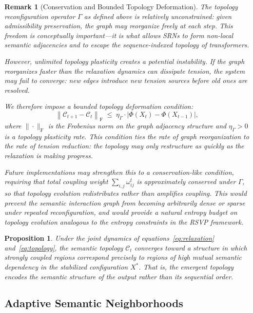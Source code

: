 \documentclass[11pt, a4paper]{article}
\theoremstyle{srn}
\newtheorem{proposition}{Proposition}[section]
\theoremstyle{srnremark}
\newtheorem{remark}{Remark}[section]
\newcommand{\Cstruct}{\mathcal{C}}           %
\newcommand{\Gop}{\Gamma}              %
\newcommand{\Phiten}{\varPhi}            %
\begin{document}
\begin{remark}[Conservation and Bounded Topology Deformation]
\label{rem:bounded}
The topology reconfiguration operator $\Gop$ as defined above is
relatively unconstrained: given admissibility preservation, the graph
may reorganize freely at each step.
This freedom is conceptually important---it is what allows SRNs to
form non-local semantic adjacencies and to escape the sequence-indexed
topology of transformers.

However, unlimited topology plasticity creates a potential instability.
If the graph reorganizes faster than the relaxation dynamics can
dissipate tension, the system may fail to converge: new edges
introduce new tension sources before old ones are resolved.

We therefore impose a \emph{bounded topology deformation} condition:
\[
  \left\|\Cstruct_{t+1} - \Cstruct_t\right\|_{\mathrm{F}}
  \;\leq\;
  \eta_{\Gamma} \cdot \left|\Phiten(X_t) - \Phiten(X_{t-1})\right|,
\]
where $\|\cdot\|_{\mathrm{F}}$ is the Frobenius norm on the graph
adjacency structure and $\eta_{\Gamma} > 0$ is a topology plasticity
rate.
This condition ties the rate of graph reorganization to the rate of
tension reduction: the topology may only restructure as quickly as
the relaxation is making progress.

Future implementations may strengthen this to a conservation-like
condition, requiring that total coupling weight $\sum_{i,j}
\omega_{ij}^t$ is approximately conserved under $\Gop$, so that
topology evolution redistributes rather than amplifies coupling.
This would prevent the semantic interaction graph from becoming
arbitrarily dense or sparse under repeated reconfiguration, and would
provide a natural entropy budget on topology evolution analogous to
the entropy constraints in the RSVP framework.
\end{remark}

\begin{proposition}
\label{prop:topology}
Under the joint dynamics of equations~\eqref{eq:relaxation}
and~\eqref{eq:topology}, the semantic topology $\Cstruct_t$ converges
toward a structure in which strongly coupled regions correspond
precisely to regions of high mutual semantic dependency in the
stabilized configuration $X^*$.
That is, the emergent topology encodes the semantic structure of the
output rather than its sequential order.
\end{proposition}

\subsection{Adaptive Semantic Neighborhoods}
\end{document}
